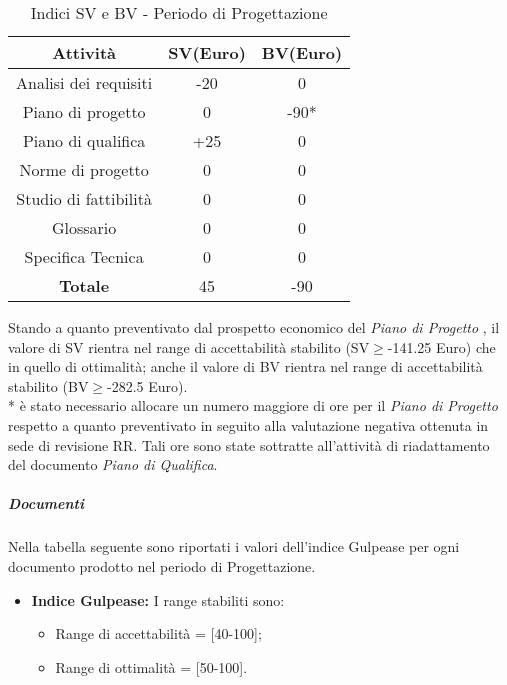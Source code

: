        
      \begin{table}[H]
        \centering
        \begin{tabular}{|c|c|c|}
          \hline
          \textbf{Attività} & \textbf{SV}(Euro)  & \textbf{BV}(Euro) \\
          \hline
          Analisi dei requisiti  & -20 & 0  \\
          Piano di progetto & 0  & -90*\\
          Piano di qualifica  & +25  & 0\\
          Norme di progetto & 0  & 0 \\
          Studio di fattibilità & 0  & 0  \\
          Glossario & 0  & 0  \\
          Specifica Tecnica & 0 & 0\\
          \hline
          \textbf{Totale} & 45  & -90  \\
          \hline
        \end{tabular}
        \caption{Indici SV e BV - Periodo di Progettazione}
      \end{table}
      Stando a quanto preventivato dal prospetto economico del \emph{Piano di Progetto \VersionePP{}}, il valore di SV rientra nel range di accettabilità stabilito (SV\(\geq\)-141.25 Euro) che in quello di ottimalità;
      anche il valore di BV rientra nel range di accettabilità stabilito (BV\(\geq\)-282.5 Euro).\\
      * è stato necessario allocare un numero maggiore di ore per il \emph{Piano di Progetto} respetto a quanto preventivato in seguito alla valutazione negativa ottenuta in sede di revisione RR. Tali ore sono state sottratte all'attività di riadattamento del documento \emph{Piano di Qualifica}\VersionePQ{}.
      
      \subparagraph{Documenti}
      Nella tabella seguente sono riportati i valori dell'indice Gulpease per ogni documento prodotto nel periodo di Progettazione.\\

\begin{itemize}
\item \textbf{Indice Gulpease: }I range stabiliti sono:
      \begin{itemize}
        \item Range di accettabilità = [40-100];
        \item Range di ottimalità = [50-100].
      \end{itemize}
\end{itemize}      
      
